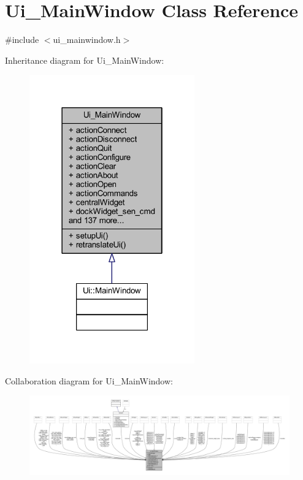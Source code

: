 \hypertarget{a00080}{\section{Ui\+\_\+\+Main\+Window Class Reference}
\label{a00080}
}


{\ttfamily \#include $<$ui\+\_\+mainwindow.\+h$>$}



Inheritance diagram for Ui\+\_\+\+Main\+Window\+:
\nopagebreak
\begin{figure}[H]
\begin{center}
\leavevmode
\includegraphics[width=202pt]{dc/d40/a00568}
\end{center}
\end{figure}


Collaboration diagram for Ui\+\_\+\+Main\+Window\+:
\nopagebreak
\begin{figure}[H]
\begin{center}
\leavevmode
\includegraphics[width=350pt]{d4/d9e/a00569}
\end{center}
\end{figure}
